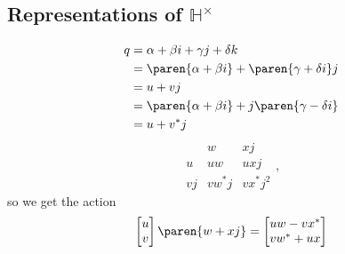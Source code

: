 \documentclass{scrartcl}
\newcommand{\ham}{\mathbb H}
\begin{document}
\begin{multicols*}{2}

  \section{Representations of \(\ham^\times\)}
  \begin{align*}
    q &= \alpha + \beta i + \gamma j + \delta k \\
      &= \paren{\alpha +\beta i} + \paren{\gamma +\delta i}j  \\
      &= u  + vj  \\
      &=\paren{\alpha+\beta i} + j\paren{\gamma - \delta i} \\
      &= u + v^*j
  \end{align*}
  \[
    \begin{array}{ccc}
      & w& xj \\
      u&uw & uxj    \\
      vj& vw^*j & vx^*j^2
    \end{array},
  \]
  so we get the action
  \begin{align*}
    \begin{bmatrix}
      u \\ v
    \end{bmatrix}
    \paren{w+xj} &=
    \begin{bmatrix}
      uw - vx^* \\ vw^* +ux
    \end{bmatrix} \\

\end{align*}
\end{multicols*}
\end{document}
